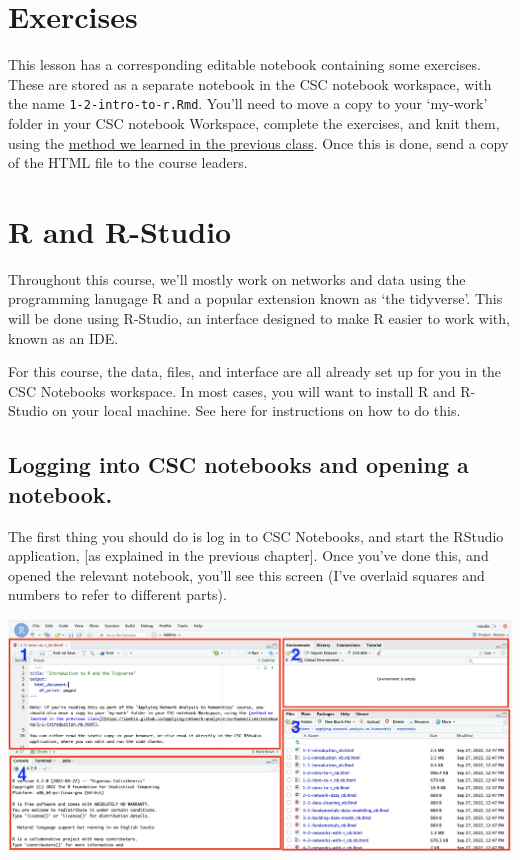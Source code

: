 \documentclass[
]{book}
\begin{document}
\hypertarget{exercises}{%
\section{Exercises}\label{exercises}}

This lesson has a corresponding editable notebook containing some exercises. These are stored as a separate notebook in the CSC notebook workspace, with the name \texttt{1-2-intro-to-r.Rmd}. You'll need to move a copy to your `my-work' folder in your CSC notebook Workspace, complete the exercises, and knit them, using the \href{https://comhis.github.io/applying-network-analysis-to-humanities/notebooks/1-1-introduction_nb.html}{method we learned in the previous class}. Once this is done, send a copy of the HTML file to the course leaders.

\hypertarget{r-and-r-studio}{%
\section{R and R-Studio}\label{r-and-r-studio}}

Throughout this course, we'll mostly work on networks and data using the programming lanugage R and a popular extension known as `the tidyverse'. This will be done using R-Studio, an interface designed to make R easier to work with, known as an IDE.

For this course, the data, files, and interface are all already set up for you in the CSC Notebooks workspace. In most cases, you will want to install R and R-Studio on your local machine. See here for instructions on how to do this.

\hypertarget{logging-into-csc-notebooks-and-opening-a-notebook.}{%
\subsection{Logging into CSC notebooks and opening a notebook.}\label{logging-into-csc-notebooks-and-opening-a-notebook.}}

The first thing you should do is log in to CSC Notebooks, and start the RStudio application, {[}as explained in the previous chapter{]}. Once you've done this, and opened the relevant notebook, you'll see this screen (I've overlaid squares and numbers to refer to different parts).

\includegraphics{images/Screenshot 2022-09-27 at 12.50.25.png}
\end{document}
